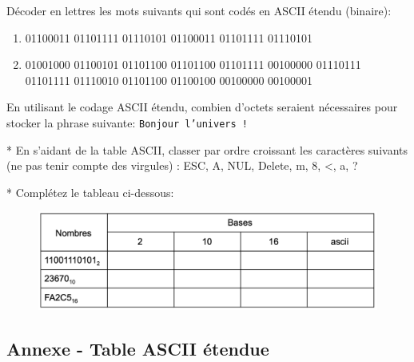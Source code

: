 \documentclass[11pt, a4paper]{book}
\begin{document}
\begin{exercice}
Décoder en lettres les mots suivants qui sont codés en ASCII étendu (binaire):
\begin{enumerate}
\item 01100011 01101111 01110101 01100011 01101111 01110101
\item 01001000 01100101 01101100 01101100 01101111 00100000 01110111 01101111 01110010 01101100 01100100 00100000 00100001
\end{enumerate}
\end{exercice}

\begin{exercice}
    En utilisant le codage ASCII étendu, combien d'octets seraient nécessaires pour stocker la phrase suivante:  \texttt{Bonjour l’univers !}
\end{exercice}

\begin{exercice}
* En s’aidant de la table ASCII, classer par ordre croissant les caractères suivants (ne pas tenir compte des virgules) : ESC, A, NUL, Delete, m, 8, <, a, ?
\end{exercice}


\begin{exercice}
* Complétez le tableau ci-dessous:

\begin{figure}[h!]
\begin{center}
\includegraphics[scale=.25]{images/tableauconversion}
\end{center}
\end{figure}
\end{exercice}

\subsection{Annexe - Table ASCII étendue}

\end{document}
